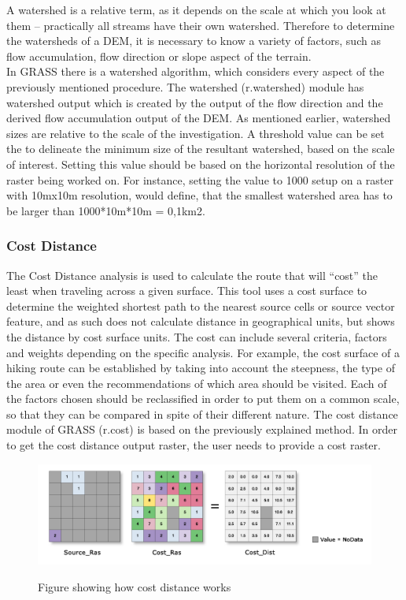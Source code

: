 A watershed is a relative term, as it depends on the scale at which you look at them – practically all streams have their own watershed. Therefore to determine the watersheds of a DEM, it is necessary to know a variety of factors, such as flow accumulation, flow direction or slope aspect of the terrain. \\
In  GRASS there is a watershed algorithm, which considers every aspect of the previously mentioned procedure. The watershed (r.watershed) module has watershed output which is created by the output of the flow direction and the derived flow accumulation output of the DEM. As mentioned earlier, watershed sizes are relative to the scale of the investigation. A threshold value can be set the to delineate the minimum size of the resultant watershed, based on the scale of interest. Setting this value should be based on the horizontal resolution of the raster being worked on. For instance, setting the value to 1000 setup on a raster with 10mx10m resolution, would define, that the smallest watershed area has to be larger than 1000*10m*10m = 0,1km2.

\subsubsection{Cost Distance}
The Cost Distance analysis is used to calculate the route that will “cost” the least when traveling across a given surface. This tool uses a cost surface to determine the weighted shortest path to the nearest source cells or source vector feature, and as such does not calculate distance in geographical units, but shows the distance by cost surface units. The cost can include several criteria, factors and weights depending on the specific analysis. For example, the cost surface of a hiking route can be established by taking into account the steepness, the type of the area or even the recommendations of which area should be visited.
Each of the factors chosen should be reclassified in order to put them on a common scale, so that they can be compared in spite of their different nature. 
The cost distance module of GRASS (r.cost) is based on the previously explained method. In order to get the cost distance output raster, the user needs to provide a cost raster.

\begin{figure}[t]
\centering
	{\includegraphics[width=\linewidth]{gfx/COST.png}}
\caption{Figure showing how cost distance works}
\end{figure}

